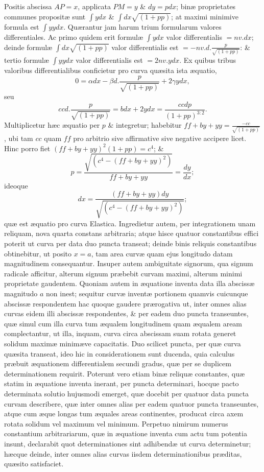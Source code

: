 Positis abscissa $AP=x$, applicata $PM=y$ \& $dy=pdx$; binæ proprietates communes propositæ sunt $\int ydx$ \& $\int dx\sqrt{(1+pp)}$; at maximi minimive formula est $\int yydx$. Quærantur jam harum trium formularum valores differentiales. Ac primo quidem erit formulæ $\int ydx$ valor differentialis $=nv.dx$; deinde formulæ
$\int dx\sqrt{(1+pp)}$ valor differentialis est $=-nv.d.\frac p{\sqrt{(1+pp)}}$: \& tertio formulæ $\int yydx$ valor differentialis est $=2nv.ydx$. Ex quibus tribus valoribus differentialibus conficietur pro curva quæsita ista æquatio,
\[0=\alpha dx-\beta d.\frac p{\sqrt{(1+pp)}}+2\gamma ydx,\]
seu
\[ccd.\frac p{\sqrt{(1+pp)}}=bdx+2ydx=\frac{ccdp}{(1+pp)^{3:2}}.\]
Multiplicetur hæc æquatio per $p$ \& integretur; habebitur $ff+by+yy=\frac{-cc}{\sqrt{(1+pp)}}$, ubi tam $cc$ quam $ff$ pro arbitrio sive affirmative sive negative accipere licet. Hinc porro fiet $(ff+by+yy)^2(1+pp)=c^4$; \&
\[p=\frac{\sqrt{(c^4-(ff+by+yy)^2)}}{ff+by+yy}=\frac{dy}{dx};\]
ideoque
\[dx=\frac{(ff+by+yy)dy}{\sqrt{(c^4-(ff+by+yy)^2)}};\]
quæ est æquatio pro curva Elastica. Ingredietur autem, per integrationem unam reliquam, nova quarta constans arbitraria; atque hisce quatuor constantibus effici poterit ut curva per data duo puncta transeat; deinde binis reliquis constantibus obtinebitur, ut posito $x=a$, tam area curvæ quam ejus longitudo datam magnitudinem consequantur. Insuper autem ambiguitate signorum, qua signum radicale afficitur, alterum signum præbebit curvam maximi, alterum minimi proprietate gaudentem. Quoniam autem in æquatione inventa data illa abscissæ magnitudo $a$ non inest; sequitur curvæ inventæ portionem quamvis cuicunque abscissæ respondentem hac quoque gaudere prærogativa ut, inter omnes alias curvas eidem illi abscissæ respondentes, \& per eadem duo puncta transeuntes, quæ simul cum illa curva tum æqualem longitudinem quam æqualem aream complectantur, ut illa, inquam, curva circa abscissam suam rotata generet solidum maximæ minimæve capacitatis. Duo scilicet puncta, per quæ curva quæsita transeat, ideo hic in considerationem sunt ducenda, quia calculus præbuit æquationem differentialem secundi gradus, quæ per se duplicem determinationem requirit. Poterunt vero etiam binæ reliquæ constantes, quæ statim in æquatione inventa inerant, per puncta determinari, hocque pacto determinata solutio hujusmodi emerget, quæ docebit per quatuor data puncta curvam describere, quæ inter omnes alias per eadem quatuor puncta transeuntes, atque cum æque longas tum æquales areas continentes, producat circa axem rotata solidum vel maximum vel minimum. Perpetuo nimirum numerus constantium arbitrariarum, quæ in æquatione inventa cum actu tum potentia insunt, declarabit quot determinationes sint adhibendæ ut curva determinetur; hæcque deinde, inter omnes alias curvas iisdem determinationibus præditas, quæsito satisfaciet.
